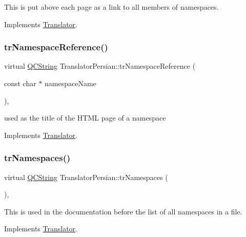 This is put above each page as a link to all members of namespaces. 

Implements \mbox{\hyperlink{class_translator}{Translator}}.

\mbox{\label{class_translator_persian_ad281faac47e89f293a08f07b9bec47a4}} 
\subsubsection{\texorpdfstring{trNamespaceReference()}{trNamespaceReference()}}
{\footnotesize\ttfamily virtual \mbox{\hyperlink{class_q_c_string}{Q\+C\+String}} Translator\+Persian\+::tr\+Namespace\+Reference (\begin{DoxyParamCaption}\item[{const char $\ast$}]{namespace\+Name }\end{DoxyParamCaption})\hspace{0.3cm}{\ttfamily [inline]}, {\ttfamily [virtual]}}

used as the title of the H\+T\+ML page of a namespace 

Implements \mbox{\hyperlink{class_translator}{Translator}}.

\mbox{\label{class_translator_persian_a7c36286e4a3e5757a078b0ebb79f549d}} 
\subsubsection{\texorpdfstring{trNamespaces()}{trNamespaces()}}
{\footnotesize\ttfamily virtual \mbox{\hyperlink{class_q_c_string}{Q\+C\+String}} Translator\+Persian\+::tr\+Namespaces (\begin{DoxyParamCaption}{ }\end{DoxyParamCaption})\hspace{0.3cm}{\ttfamily [inline]}, {\ttfamily [virtual]}}

This is used in the documentation before the list of all namespaces in a file. 

Implements \mbox{\hyperlink{class_translator}{Translator}}.

\mbox{\label{class_translator_persian_addaea0e6c495cf11ff8454962e1e8376}} 
